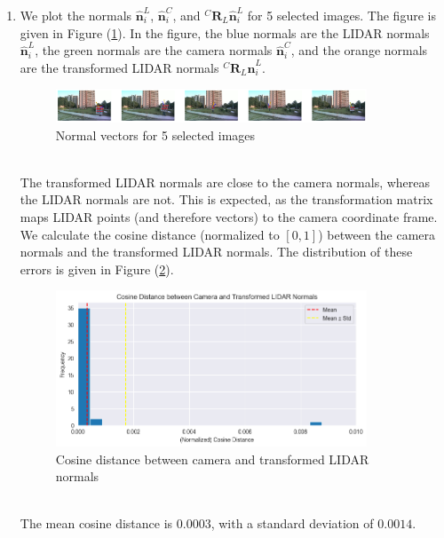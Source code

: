 \documentclass[10pt]{article}
\newcommand{\figref}[1]{Figure (\ref{fig:#1})}
\begin{document}
\begin{enumerate}
        \item We plot the normals $\mathbf{\hat{n}}_{i}^{L}$, $\mathbf{\hat{n}}_{i}^{C}$,
        and $^{C} \mathbf{R}_{L} \mathbf{\hat{n}}_{i}^{L}$ for 5 selected images. The
        figure is given in \figref{normals-lidar}. In the figure, the blue normals are
        the LIDAR normals $\mathbf{\hat{n}}_{i}^{L}$, the green normals are the camera
        normals $\mathbf{\hat{n}}_{i}^{C}$, and the orange normals are the transformed
        LIDAR normals $^{C} \mathbf{R}_{L} \mathbf{\hat{n}}_{i}^{L}$.
        \begin{figure}[htbp]
            \begin{center}
                \includegraphics[width=0.875\textwidth]{Assets/Question-5/normals.png}
                \caption{Normal vectors for 5 selected images}
                \label{fig:normals-lidar}
            \end{center}
        \end{figure}
        \vspace*{0pt} \\
        The transformed LIDAR normals are close to the camera normals, whereas the LIDAR
        normals are not. This is expected, as the transformation matrix maps LIDAR points
        (and therefore vectors) to the camera coordinate frame. \\
        We calculate the cosine distance (normalized to $[0, 1]$) between the camera
        normals and the transformed LIDAR normals. The distribution of these errors is
        given in \figref{cosine-distances}.
        \begin{figure}[htbp]
            \begin{center}
                \includegraphics[width=0.875\textwidth]{Assets/Question-5/cosine-distances.png}
                \caption{Cosine distance between camera and transformed LIDAR normals}
                \label{fig:cosine-distances}
            \end{center}
        \end{figure}
        \vspace*{0pt} \\
        The mean cosine distance is $0.0003$, with a standard deviation of $0.0014$.
    \end{enumerate}
    \pagebreak
\end{document}
